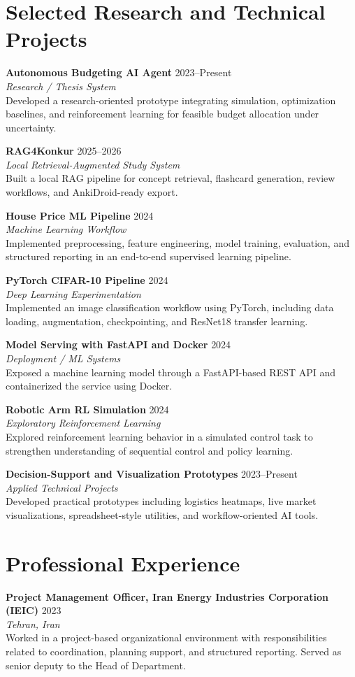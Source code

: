 \documentclass[11pt,a4paper]{article}
\newcommand{\Entry}[4]{
    \textbf{#1} \hfill {\color{gray}#2}\\
    \textit{#3}\\
    #4
    \vspace{0.8em}
}
\begin{document}
\section*{Selected Research and Technical Projects}

\Entry
{Autonomous Budgeting AI Agent}
{2023--Present}
{Research / Thesis System}
{
Developed a research-oriented prototype integrating simulation, optimization baselines, and reinforcement learning for feasible budget allocation under uncertainty.
}

\Entry
{RAG4Konkur}
{2025--2026}
{Local Retrieval-Augmented Study System}
{
Built a local RAG pipeline for concept retrieval, flashcard generation, review workflows, and AnkiDroid-ready export.
}

\Entry
{House Price ML Pipeline}
{2024}
{Machine Learning Workflow}
{
Implemented preprocessing, feature engineering, model training, evaluation, and structured reporting in an end-to-end supervised learning pipeline.
}

\Entry
{PyTorch CIFAR-10 Pipeline}
{2024}
{Deep Learning Experimentation}
{
Implemented an image classification workflow using PyTorch, including data loading, augmentation, checkpointing, and ResNet18 transfer learning.
}

\Entry
{Model Serving with FastAPI and Docker}
{2024}
{Deployment / ML Systems}
{
Exposed a machine learning model through a FastAPI-based REST API and containerized the service using Docker.
}

\Entry
{Robotic Arm RL Simulation}
{2024}
{Exploratory Reinforcement Learning}
{
Explored reinforcement learning behavior in a simulated control task to strengthen understanding of sequential control and policy learning.
}

\Entry
{Decision-Support and Visualization Prototypes}
{2023--Present}
{Applied Technical Projects}
{
Developed practical prototypes including logistics heatmaps, live market visualizations, spreadsheet-style utilities, and workflow-oriented AI tools.
}

\section*{Professional Experience}

\Entry
{Project Management Officer, Iran Energy Industries Corporation (IEIC)}
{2023}
{Tehran, Iran}
{
Worked in a project-based organizational environment with responsibilities related to coordination, planning support, and structured reporting.
Served as senior deputy to the Head of Department.
}
\end{document}
